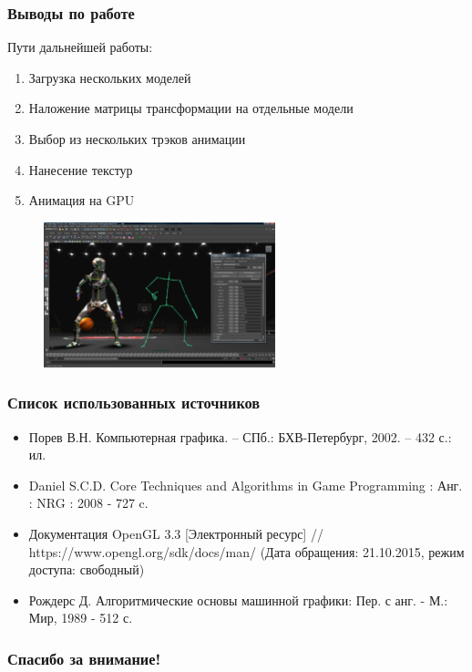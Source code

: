 \documentclass{beamer}
\begin{document}
\begin{frame}
\frametitle{Выводы по работе}
    Пути дальнейшей работы:
\begin{enumerate} 
	\item Загрузка нескольких моделей
	\item Наложение матрицы трансформации на отдельные модели
	\item Выбор из нескольких трэков анимации
	\item Нанесение текстур
	\item Анимация на GPU
\end{enumerate}

\begin{figure}[h!]
    \flushright
    \includegraphics[width=0.6\textwidth]{win_maya.png}
\end{figure}

\end{frame}




\begin{frame}
\frametitle{Список использованных источников}
\begin{itemize}

\item
Порев В.Н. Компьютерная графика. – СПб.: БХВ-Петербург, 2002. – 432 с.: ил.

\item 
Daniel S.C.D. Core Techniques and Algorithms in Game Programming : Анг. : NRG : 2008 - 727 c.

\item
Документация OpenGL 3.3 [Электронный ресурс] // https://www.opengl.org/sdk/docs/man/ (Дата обращения: 21.10.2015, режим доступа: свободный)

\item
Рождерс Д. Алгоритмические основы машинной графики: Пер. с анг. - М.: Мир, 1989 - 512 с.
    
\end{itemize}
\end{frame}




\begin{frame}[c]
\begin{center}
\frametitle{\LARGE Спасибо за внимание!}

{\LARGE \inserttitle}

\bigskip

{\insertauthor}

\bigskip\bigskip

{\insertinstitute}

\bigskip\bigskip

{\large \insertdate}
\end{center}
\end{frame}
\end{document}
